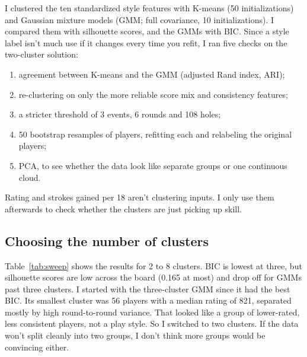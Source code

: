 
I clustered the ten standardized style features with K-means (50 initializations) and Gaussian mixture models (GMM; full covariance, 10 initializations). I compared them with silhouette scores, and the GMMs with BIC. Since a style label isn't much use if it changes every time you refit, I ran five checks on the two-cluster solution:
\begin{enumerate}
  \item agreement between K-means and the GMM (adjusted Rand index, ARI);
  \item re-clustering on only the more reliable score mix and consistency features;
  \item a stricter threshold of 3 events, 6 rounds and 108 holes;
  \item 50 bootstrap resamples of players, refitting each and relabeling the original players;
  \item PCA, to see whether the data look like separate groups or one continuous cloud.
\end{enumerate}
Rating and strokes gained per 18 aren't clustering inputs. I only use them afterwards to check whether the clusters are just picking up skill.

\subsection{Choosing the number of clusters}

Table~\ref{tab:sweep} shows the results for 2 to 8 clusters. BIC is lowest at three, but silhouette scores are low across the board (0.165 at most) and drop off for GMMs past three clusters. I started with the three-cluster GMM since it had the best BIC. Its smallest cluster was 56 players with a median rating of 821, separated mostly by high round-to-round variance. That looked like a group of lower-rated, less consistent players, not a play style. So I switched to two clusters. If the data won't split cleanly into two groups, I don't think more groups would be convincing either.

